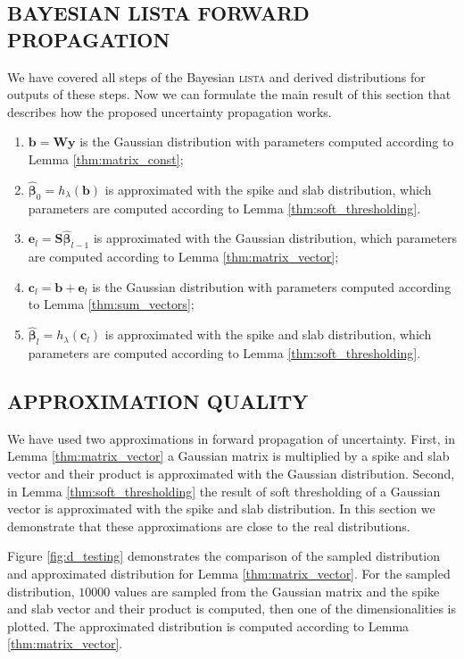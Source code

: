 \documentclass[letterpaper]{article}
\begin{document}
\subsection{\uppercase{Bayesian lista forward propagation}}
We have covered all steps of the Bayesian \textsc{lista} and derived distributions for outputs of these steps. Now we can formulate the main result of this section that describes how the proposed uncertainty propagation works.

\begin{enumerate}
	\item $\mathbf{b} = \mathbf{W}\mathbf{y}$ is the Gaussian distribution with parameters computed according to Lemma \ref{thm:matrix_const};
	\item $\widehat{\boldsymbol\beta}_{0} = h_\lambda(\mathbf{b})$ is approximated with the spike and slab distribution, which parameters are computed according to Lemma \ref{thm:soft_thresholding}.
	\item $\mathbf{e}_l = \mathbf{S}\widehat{\boldsymbol\beta}_{l-1}$ is approximated with the Gaussian distribution, which parameters are computed according to Lemma \ref{thm:matrix_vector};
	\item $\mathbf{c}_l = \mathbf{b} + \mathbf{e}_l$ is the Gaussian distribution with parameters computed according to Lemma \ref{thm:sum_vectors};
	\item $\widehat{\boldsymbol\beta}_{l} = h_\lambda(\mathbf{c}_l)$ is approximated with the spike and slab distribution, which parameters are computed according to Lemma \ref{thm:soft_thresholding}.
\end{enumerate}


\subsection{\uppercase{Approximation quality}}
\label{sec:approx_quality}
We have used two approximations in forward propagation of uncertainty. First, {\color{red} in Lemma \ref{thm:matrix_vector}} a Gaussian matrix is multiplied by a spike and slab vector and their product is approximated with the Gaussian distribution. Second, {\color{red} in Lemma \ref{thm:soft_thresholding}} the result of soft thresholding of a Gaussian vector is approximated with the spike and slab distribution. In this section we demonstrate that these approximations are close to the real distributions.

Figure \ref{fig:d_testing} demonstrates the comparison of the sampled distribution and approximated distribution for Lemma \ref{thm:matrix_vector}. For the sampled distribution, $10000$ values are sampled from the Gaussian matrix and the spike and slab vector and their product is computed, then one of the dimensionalities is plotted. The approximated distribution is computed according to Lemma \ref{thm:matrix_vector}.
\end{document}
